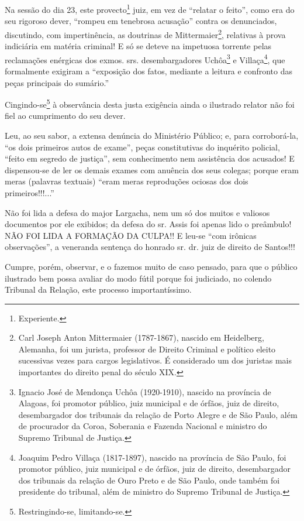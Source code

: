 Na sessão do dia 23, este provecto\footnote{Experiente.} juiz, em vez de
``relatar o feito'', como era do seu rigoroso dever, ``rompeu em
tenebrosa acusação'' contra os denunciados, discutindo, com
impertinência, as doutrinas de Mittermaier\footnote{Carl Joseph Anton
  Mittermaier (1787-1867), nascido em Heidelberg, Alemanha, foi um
  jurista, professor de Direito Criminal e político eleito sucessivas
  vezes para cargos legislativos. É considerado um dos juristas mais
  importantes do direito penal do século XIX.}, relativas à prova
indiciária em matéria criminal! E só se deteve na impetuosa torrente
pelas reclamações enérgicas dos exmos. srs. desembargadores
Uchôa\footnote{Ignacio José de Mendonça Uchôa (1920-1910), nascido na
  província de Alagoas, foi promotor público, juiz municipal e de
  órfãos, juiz de direito, desembargador dos tribunais da relação de
  Porto Alegre e de São Paulo, além de procurador da Coroa, Soberania e
  Fazenda Nacional e ministro do Supremo Tribunal de Justiça.} e
Villaça\footnote{Joaquim Pedro Villaça (1817-1897), nascido na província
  de São Paulo, foi promotor público, juiz municipal e de órfãos, juiz
  de direito, desembargador dos tribunais da relação de Ouro Preto e de
  São Paulo, onde também foi presidente do tribunal, além de ministro do
  Supremo Tribunal de Justiça.}, que formalmente exigiram a ``exposição
dos fatos, mediante a leitura e confronto das peças principais do
sumário.''

Cingindo-se\footnote{Restringindo-se, limitando-se.} à observância desta
justa exigência ainda o ilustrado relator não foi fiel ao cumprimento do
seu dever.

Leu, ao seu sabor, a extensa denúncia do Ministério Público; e, para
corroborá-la, ``os dois primeiros autos de exame'', peças constitutivas
do inquérito policial, ``feito em segredo de justiça'', sem conhecimento
nem assistência dos acusados! E dispensou-se de ler os demais exames com
anuência dos seus colegas; porque eram meras (palavras textuais) ``eram
meras reproduções ociosas dos dois primeiros!!!...''

Não foi lida a defesa do major Largacha, nem um só dos muitos e valiosos
documentos por ele exibidos; da defesa do sr. Assis foi apenas lido o
preâmbulo! NÃO FOI LIDA A FORMAÇÃO DA CULPA!! E leu-se ``com irônicas
observações'', a veneranda sentença do honrado sr. dr. juiz de direito
de Santos!!!

Cumpre, porém, observar, e o fazemos muito de caso pensado, para que o
público ilustrado bem possa avaliar do modo fútil porque foi judiciado,
no colendo Tribunal da Relação, este processo importantíssimo.

